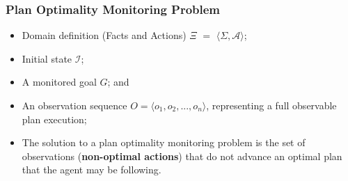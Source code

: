 \documentclass{beamer}
\begin{document}
\begin{frame}[c]\frametitle{Plan Optimality Monitoring Problem}
	\begin{definition}
		\begin{itemize}
   			\item Domain definition (Facts and Actions) $\Xi$ $=$ $\langle \Sigma, \mathcal{A} \rangle$;
   			\item Initial state \textbf{$\mathcal{I}$};
   			\item A monitored goal $G$; and
   			\item An observation sequence $O = \langle o_1, o_2, ..., o_n \rangle$, representing a full observable plan execution;
   		\end{itemize}			
	\end{definition}
	\begin{itemize}
		\item The solution to a plan optimality monitoring problem is the set of observations (\textbf{non-optimal actions}) that do not advance an optimal plan that the agent may be following.
	\end{itemize}
\end{frame}
\end{document}
